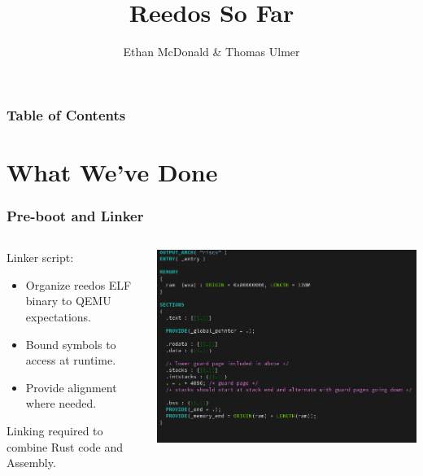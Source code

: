 \documentclass{beamer}
\author{Ethan McDonald \& Thomas Ulmer}
\title{Reedos So Far}
\begin{document}
\begin{frame}
  \maketitle
\end{frame}

\begin{frame}
  \frametitle{Table of Contents}
  \tableofcontents
\end{frame}

\section{What We've Done}

\begin{frame}
  \frametitle{Pre-boot and Linker}
  \begin{columns}
    \begin{column}{0.5\textwidth}
      Linker script:
      \begin{itemize}
      \item Organize reedos ELF binary to QEMU expectations.\\
      \item Bound symbols to access at runtime.\\
      \item Provide alignment where needed.\\
      \end{itemize}
      Linking required to combine Rust code and Assembly.
    \end{column}

    \begin{column}{0.5\textwidth}
      \includegraphics[width=\textwidth]{linker.png}
    \end{column}

  \end{columns}

\end{frame}
\end{document}
